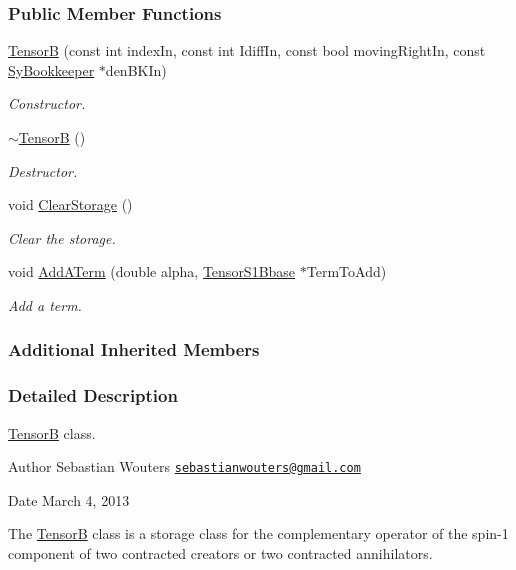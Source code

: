 \subsubsection*{Public Member Functions}
\begin{DoxyCompactItemize}
\item 
\hyperlink{classCheMPS2_1_1TensorB_adc60f029099158ba66e29873fa628703}{Tensor\-B} (const int index\-In, const int Idiff\-In, const bool moving\-Right\-In, const \hyperlink{classCheMPS2_1_1SyBookkeeper}{Sy\-Bookkeeper} $\ast$den\-B\-K\-In)
\begin{DoxyCompactList}\small\item\em Constructor. \end{DoxyCompactList}\item 
\hypertarget{classCheMPS2_1_1TensorB_ae9206cefeccaf3984b6ea86bf9a81301}{\hyperlink{classCheMPS2_1_1TensorB_ae9206cefeccaf3984b6ea86bf9a81301}{$\sim$\-Tensor\-B} ()}\label{classCheMPS2_1_1TensorB_ae9206cefeccaf3984b6ea86bf9a81301}

\begin{DoxyCompactList}\small\item\em Destructor. \end{DoxyCompactList}\item 
\hypertarget{classCheMPS2_1_1TensorB_a28ab08500c8aa76cba2f155f284274ee}{void \hyperlink{classCheMPS2_1_1TensorB_a28ab08500c8aa76cba2f155f284274ee}{Clear\-Storage} ()}\label{classCheMPS2_1_1TensorB_a28ab08500c8aa76cba2f155f284274ee}

\begin{DoxyCompactList}\small\item\em Clear the storage. \end{DoxyCompactList}\item 
void \hyperlink{classCheMPS2_1_1TensorB_a5d55f80f8053d96b413542db4a3d9b9a}{Add\-A\-Term} (double alpha, \hyperlink{classCheMPS2_1_1TensorS1Bbase}{Tensor\-S1\-Bbase} $\ast$Term\-To\-Add)
\begin{DoxyCompactList}\small\item\em Add a term. \end{DoxyCompactList}\end{DoxyCompactItemize}
\subsubsection*{Additional Inherited Members}


\subsubsection{Detailed Description}
\hyperlink{classCheMPS2_1_1TensorB}{Tensor\-B} class. \begin{DoxyAuthor}{Author}
Sebastian Wouters \href{mailto:sebastianwouters@gmail.com}{\tt sebastianwouters@gmail.\-com} 
\end{DoxyAuthor}
\begin{DoxyDate}{Date}
March 4, 2013
\end{DoxyDate}
The \hyperlink{classCheMPS2_1_1TensorB}{Tensor\-B} class is a storage class for the complementary operator of the spin-\/1 component of two contracted creators or two contracted annihilators. 

